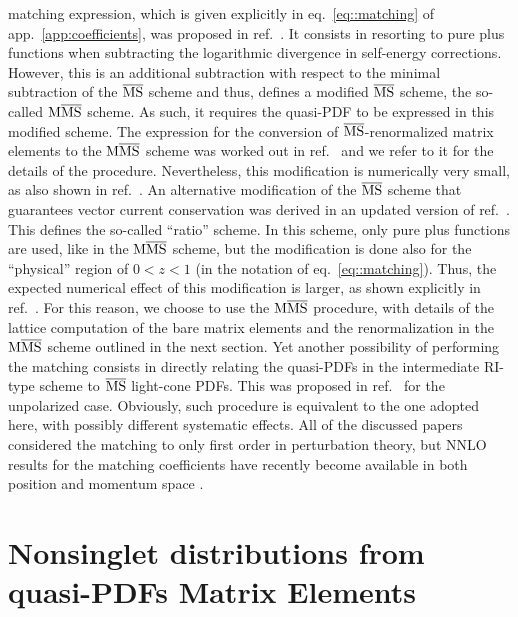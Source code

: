 matching expression, which is given explicitly in eq.~\eqref{eq::matching} of
app.~\ref{app:coefficients}, was proposed in ref.~\cite{Alexandrou:2018pbm}. It
consists in resorting to pure plus functions when subtracting the logarithmic
divergence in self-energy corrections. However, this is an additional
subtraction with respect to the minimal subtraction of the $\overline{\mathrm{MS}}$ scheme and
thus, defines a modified $\overline{\mathrm{MS}}$ scheme, the so-called ${\rm M}\overline{\mathrm{MS}}$ scheme. As such,
it requires the quasi-PDF to be expressed in this modified scheme. The
expression for the conversion of $\overline{\mathrm{MS}}$-renormalized matrix elements to the
${\rm M}\overline{\mathrm{MS}}$ scheme was worked out in ref.~\cite{Alexandrou:2019lfo} and we refer to
it for the details of the procedure. Nevertheless, this modification is
numerically very small, as also shown in ref.~\cite{Alexandrou:2019lfo}. An
alternative modification of the $\overline{\mathrm{MS}}$ scheme that guarantees vector current
conservation was derived in an updated version of ref.~\cite{Izubuchi:2018srq}.
This defines the so-called ``ratio'' scheme. In this scheme, only pure plus
functions are used, like in the ${\rm M}\overline{\mathrm{MS}}$ scheme, but the modification is done
also for the ``physical'' region of $0<z<1$ (in the notation of
eq.~\eqref{eq::matching}). Thus, the expected numerical effect of this
modification is larger, as shown explicitly in ref.~\cite{Alexandrou:2019lfo}.
For this reason, we choose to use the ${\rm M}\overline{\mathrm{MS}}$ procedure, with details of the
lattice computation of the bare matrix elements and the renormalization in the
${\rm M}\overline{\mathrm{MS}}$ scheme outlined in the next section. Yet another possibility of
performing the matching consists in directly relating the quasi-PDFs in the
intermediate RI-type scheme to $\overline{\mathrm{MS}}$ light-cone PDFs. This was proposed in
ref.~\cite{Stewart:2017tvs} for the unpolarized case. Obviously, such
procedure is equivalent to the one adopted here, with possibly different
systematic effects. All of the discussed papers considered the matching to only
first order in perturbation theory, but NNLO results for the matching coefficients have recently become available
in both position and momentum space \cite{Li:2020xml, Chen:2020ody, Braun:2020ymy, Chen:2020arf, Chen:2020iqi}.


\section{Nonsinglet distributions from quasi-PDFs Matrix Elements}
\label{sec:PDFstoqPDFs}

